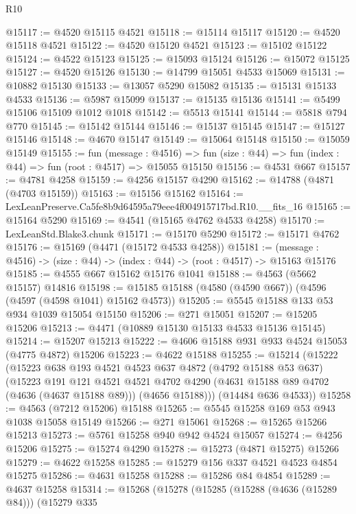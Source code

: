 \begin{lexlean}{R10}
\begin{coremodule}
@15117 := @4520 @15115 @4521
@15118 := @15114 @15117
@15120 := @4520 @15118 @4521
@15122 := @4520 @15120 @4521
@15123 := @15102 @15122
@15124 := @4522 @15123
@15125 := @15093 @15124
@15126 := @15072 @15125
@15127 := @4520 @15126
@15130 := @14799 @15051 @4533 @15069
@15131 := @10882 @15130
@15133 := @13057 @5290 @15082
@15135 := @15131 @15133 @4533
@15136 := @5987 @15099
@15137 := @15135 @15136
@15141 := @5499 @15106 @15109 @1012 @1018
@15142 := @5513 @15141
@15144 := @5818 @794 @770
@15145 := @15142 @15144
@15146 := @15137 @15145
@15147 := @15127 @15146
@15148 := @4670 @15147
@15149 := @15064 @15148
@15150 := @15059 @15149
@15155 := fun (message : @4516) =>
  fun (size : @44) => fun (index : @44) => fun (root : @4517) => @15055 @15150
@15156 := @4531 @667
@15157 := @4781 @4258
@15159 := @4256 @15157 @4290
@15162 := @14788 (@4871 (@4703 @15159))
@15163 := @15156 @15162
@15164 := LexLeanPreserve.Ca5fe8b9d64595a79eee4f004915717bd.R10.__fits_16
@15165 := @15164 @5290
@15169 := @4541 (@15165 @4762 @4533 @4258)
@15170 := LexLeanStd.Blake3.chunk
@15171 := @15170 @5290
@15172 := @15171 @4762
@15176 := @15169 (@4471 (@15172 @4533 @4258))
@15181 := (message : @4516) -> (size : @44) -> (index : @44) -> (root : @4517) -> @15163 @15176
@15185 := @4555 @667 @15162 @15176 @1041
@15188 := @4563 (@5662 @15157) @14816
@15198 := @15185 @15188 (@4580 (@4590 @667)) (@4596 (@4597 (@4598 @1041) @15162 @4573))
@15205 := @5545 @15188 @133 @53 @934 @1039 @15054 @15150
@15206 := @271 @15051
@15207 := @15205 @15206
@15213 := @4471 (@10889 @15130 @15133 @4533 @15136 @15145)
@15214 := @15207 @15213
@15222 := @4606 @15188 @931 @933 @4524 @15053 (@4775 @4872) @15206
@15223 := @4622 @15188
@15255 := @15214
    (@15222
      (@15223
        @638
        @193
        @4521
        @4523
        @637
        @4872
        (@4792 @15188 @53 @637)
        (@15223
          @191
          @121
          @4521
          @4521
          @4702
          @4290
          (@4631 @15188 @89 @4702 (@4636 (@4637 @15188 @89)))
          (@4656 @15188)))
      (@14484 @636 @4533))
@15258 := @4563 (@7212 @15206) @15188
@15265 := @5545 @15258 @169 @53 @943 @1038 @15058 @15149
@15266 := @271 @15061
@15268 := @15265 @15266 @15213
@15273 := @5761 @15258 @940 @942 @4524 @15057
@15274 := @4256 @15206
@15275 := @15274 @4290
@15278 := @15273 (@4871 @15275) @15266
@15279 := @4622 @15258
@15285 := @15279 @156 @337 @4521 @4523 @4854 @15275
@15286 := @4631 @15258
@15288 := @15286 @84 @4854
@15289 := @4637 @15258
@15314 := @15268
    (@15278
      (@15285
        (@15288 (@4636 (@15289 @84)))
        (@15279
          @335

\end{coremodule}
\end{lexlean}
